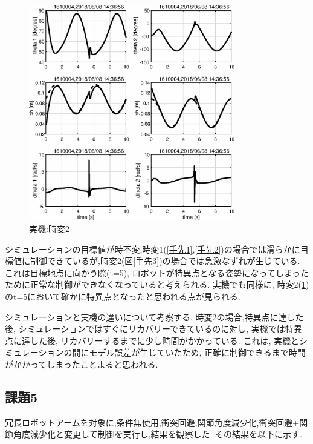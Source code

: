 \documentclass[a4paper,11pt,titlepage]{jsarticle}
\begin{document}
{\begin{figure}[H]
  \begin{center}
    \includegraphics[width = 9cm]{画像/eps_実機実験_手先_時変2_時間応答}
    \caption{実機:時変2}
    \label{手先3/実機}
  \end{center}
\end{figure}

シミュレーションの目標値が時不変,時変1(\ref{手先1},\ref{手先2})の場合では滑らかに目標値に制御できているが,時変2(図\ref{手先3})の場合では急激なずれが生じている.
これは目標地点に向かう際(t=5), ロボットが特異点となる姿勢になってしまったために正常な制御ができなくなっていると考えられる.
実機でも同様に, 時変2(\ref{手先3/実機})のt=5において確かに特異点となったと思われる点が見られる.
\par
シミュレーションと実機の違いについて考察する.
時変2の場合,特異点に達した後, シミュレーションではすぐにリカバリーできているのに対し, 実機では特異点に達した後,
リカバリーするまでに少し時間がかかっている. これは, 実機とシミュレーションの間にモデル誤差が生じていたため, 正確に制御できるまで時間がかかってしまったことよると思われる.

\subsection{課題5}
冗長ロボットアームを対象に,条件無使用,衝突回避,関節角度減少化,衝突回避+関節角度減少化と変更して制御を実行し,結果を観察した.
その結果を以下に示す.

}
\end{document}
